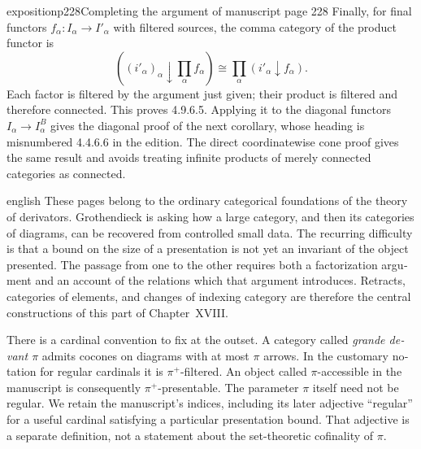 \begin{dcomment}{exposition}{p228}{Completing the argument of manuscript page 228}
Finally, for final functors $f_\alpha:I_\alpha\to I'_\alpha$ with filtered sources, the comma category of the product functor is
\[
 ((i'_\alpha)_\alpha\downarrow\prod_\alpha f_\alpha)
 \cong\prod_\alpha(i'_\alpha\downarrow f_\alpha).
\]
Each factor is filtered by the argument just given; their product is filtered and therefore connected. This proves 4.9.6.5. Applying it to the diagonal functors $I_\alpha\to I_\alpha^B$ gives the diagonal proof of the next corollary, whose heading is misnumbered 4.4.6.6 in the edition. The direct coordinatewise cone proof gives the same result and avoids treating infinite products of merely connected categories as connected.
\end{dcomment}
\begin{otherlanguage}{english}
\begin{otherlanguage*}{english}
These pages belong to the ordinary categorical foundations of the theory of derivators. Grothendieck is asking how a large category, and then its categories of diagrams, can be recovered from controlled small data. The recurring difficulty is that a bound on the size of a presentation is not yet an invariant of the object presented. The passage from one to the other requires both a factorization argument and an account of the relations which that argument introduces. Retracts, categories of elements, and changes of indexing category are therefore the central constructions of this part of Chapter~XVIII.

There is a cardinal convention to fix at the outset. A category called \emph{grande devant $\pi$} admits cocones on diagrams with at most $\pi$ arrows. In the customary notation for regular cardinals it is $\pi^+$-filtered. An object called $\pi$-accessible in the manuscript is consequently $\pi^+$-presentable. The parameter $\pi$ itself need not be regular. We retain the manuscript's indices, including its later adjective ``regular'' for a useful cardinal satisfying a particular presentation bound. That adjective is a separate definition, not a statement about the set-theoretic cofinality of $\pi$.


\end{otherlanguage*}
\end{otherlanguage}

